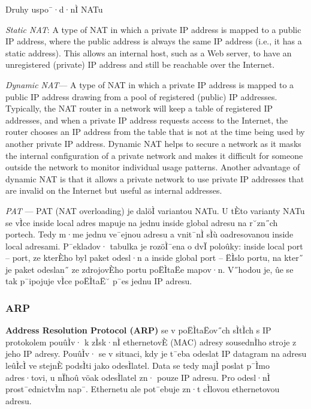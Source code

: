\begin{obecne}{Druhy uspo¯·d·nÌ NATu}
\begin{pitemize}
\item \emph{Static NAT}: A type of NAT in which a private IP address is mapped to a public IP address, where the public address is always the same IP address (i.e., it has a static address). This allows an internal host, such as a Web server, to have an unregistered (private) IP address and still be reachable over the Internet.

\item \emph{Dynamic NAT}--- A type of NAT in which a private IP address is mapped to a public IP address drawing from a pool of registered (public) IP addresses. Typically, the NAT router in a network will keep a table of registered IP addresses, and when a private IP address requests access to the Internet, the router chooses an IP address from the table that is not at the time being used by another private IP address. Dynamic NAT helps to secure a network as it masks the internal configuration of a private network and makes it difficult for someone outside the network to monitor individual usage patterns. Another advantage of dynamic NAT is that it allows a private network to use private IP addresses that are invalid on the Internet but useful as internal addresses.

\item \emph{PAT} --- PAT (NAT overloading) je dalöÌ variantou NATu. U tÈto varianty NATu se vÌce inside local adres mapuje na jednu inside global adresu na r˘zn˝ch portech. Tedy m·me jednu ve¯ejnou adresu a vnit¯nÌ sÌù oadresovanou inside local adresami. 
P¯ekladov· tabulka je rozöÌ¯ena o dvÏ poloûky: inside local port -- port, ze kterÈho byl paket odesl·n a inside global port -- ËÌslo portu, na kter˝ je paket odeslan˝ ze zdrojovÈho portu poËÌtaËe mapov·n. V˝hodou je, ûe se tak p¯ipojuje vÌce poËÌtaË˘ p¯es jednu IP adresu.
\end{pitemize}
\end{obecne}


\subsubsection*{ARP}

\textbf{Address Resolution Protocol (ARP)} se v poËÌtaËov˝ch sÌtÌch s IP protokolem pouûÌv· k zÌsk·nÌ ethernetovÈ (MAC) adresy sousednÌho stroje z jeho IP adresy. PouûÌv· se v situaci, kdy je t¯eba odeslat IP datagram na adresu leûÌcÌ ve stejnÈ podsÌti jako odesÌlatel. Data se tedy majÌ poslat p¯Ìmo adres·tovi, u nÏhoû vöak odesÌlatel zn· pouze IP adresu. Pro odesl·nÌ prost¯ednictvÌm nap¯. Ethernetu ale pot¯ebuje zn·t cÌlovou ethernetovou adresu.

